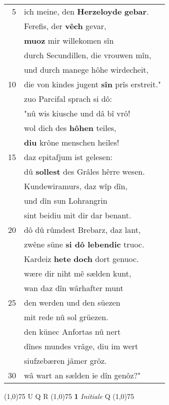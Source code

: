 \documentclass[8pt,a4paper,notitlepage]{article}
\begin{document}
\begin{table}[ht]
\begin{minipage}[t]{0.5\linewidth}
\begin{tabular}{rl}
5 & ich meine, den \textbf{Herzeloyde} \textbf{gebar}.\\ 
 & Ferefis, der \textbf{vêch} gevar,\\ 
 & \textbf{muoz} mir willekomen sîn\\ 
 & durch Secundillen, die vrouwen mîn,\\ 
 & und durch manege hôhe wirdecheit,\\ 
10 & die von kindes jugent \textbf{sîn} prîs erstreit."\\ 
 & zuo Parcifal sprach si dô:\\ 
 & "nû wis kiusche und dâ bî vrô!\\ 
 & wol dich des \textbf{hôhen} teiles,\\ 
 & \textbf{diu} krône menschen heiles!\\ 
15 & daz epitafjum ist gelesen:\\ 
 & dû \textbf{sollest} des Grâles hêrre wesen.\\ 
 & Kundewiramurs, daz wîp dîn,\\ 
 & und dîn sun Lohrangrin\\ 
 & sint beidiu mit dir dar benant.\\ 
20 & dô dû rûmdest Brebarz, daz lant,\\ 
 & zwêne süne \textbf{si dô lebendic} truoc.\\ 
 & Kardeiz \textbf{hete} \textbf{doch} dort genuoc.\\ 
 & wære dir niht mê sælden kunt,\\ 
 & wan daz dîn wârhafter munt\\ 
25 & den werden und den süezen\\ 
 & mit rede nû sol grüezen.\\ 
 & den künec Anfortas nû nert\\ 
 & dînes mundes vrâge, diu im wert\\ 
 & siufzebæren jâmer grôz.\\ 
30 & wâ wart an sælden ie dîn genôz?"\\ 
\end{tabular}
\scriptsize
\line(1,0){75} \newline
U Q R \newline
\line(1,0){75} \newline
\textbf{1} \textit{Initiale} Q  \newline
\line(1,0){75} \newline

\end{minipage}
\end{table}
\end{document}

